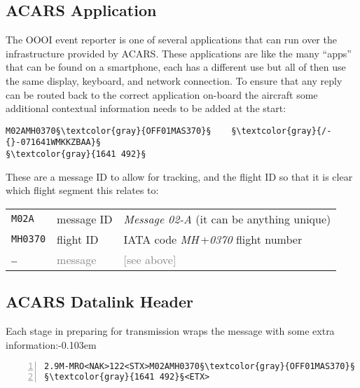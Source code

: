 \documentclass[tikz,a4paper,12pt]{article}
\begin{document}
\subsection{ACARS Application}

The \gls{OOOI} event reporter is one of several applications that can run
over the infrastructure provided by \gls{ACARS}.  These applications are
like the many ``apps'' that can be found on a smartphone, each has a
different use but all of then use the same display, keyboard, and network
connection. To ensure that any reply can be routed back to the correct
application on-board the aircraft some additional contextual information needs to be added at the
start:

\begin{lstlisting}[language=ACARS,linewidth=\textwidth]
M02AMH0370§\textcolor{gray}{OFF01MAS370}§    §\textcolor{gray}{/-{}-071641WMKKZBAA}§
§\textcolor{gray}{1641 492}§
\end{lstlisting}

These are a message ID to allow for tracking, and the flight ID so
that it is clear which flight segment this relates to:

\begin{center}
\begin{tabular}{p{1.5cm}p{2cm}p{8cm}}
\hfill\texttt{M02A}&message ID&\emph{Message 02-A} (it can be anything unique)\\
\hfill\texttt{MH0370}&flight ID&\acrshort{IATA} code \emph{MH}\,+\emph{0370} flight number\\
\hline
\hfill\textcolor{gray}{\texttt{\ldots}}&\textcolor{gray}{message}&\textcolor{gray}{[see above]}\\
\end{tabular}
\end{center}

\newpage
\subsection{ACARS Datalink Header}

{Each stage in preparing for transmission wraps the message with some extra information:\unskip\parfillskip-0.103em \par}

\begin{lstlisting}[language=ACARS,numbers=left,linewidth=\textwidth]
2.9M-MRO<NAK>122<STX>M02AMH0370§\textcolor{gray}{OFF01MAS370}§    §\textcolor{gray}{/-{}-071641WMKKZBAA}§\r\n
§\textcolor{gray}{1641 492}§<ETX>
\end{lstlisting}
\end{document}

